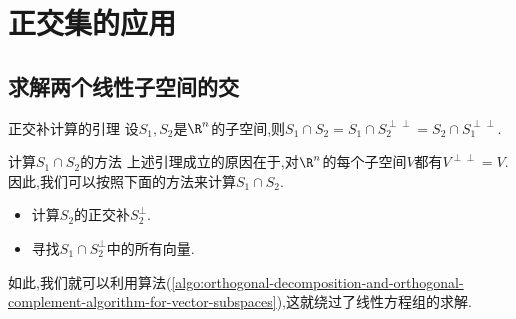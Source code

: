 \chapter{正交集的应用}

\section{求解两个线性子空间的交}

\begin{lemma}{正交补计算的引理}{}
	设$S_{1},S_{2}$是$\R^{n}$的子空间,则$S_{1}\cap S_{2}=S_{1}\cap S_{2}^{\perp\perp}=S_{2}\cap S_{1}^{\perp\perp}$.
\end{lemma}

\begin{remark}{计算$S_{1}\cap S_{2}$的方法}{}
	上述引理成立的原因在于,对$\R^{n}$的每个子空间$V$都有$V^{\perp\perp}=V$.因此,我们可以按照下面的方法来计算$S_{1}\cap S_{2}$.
	\begin{itemize}
		\item 计算$S_{2}$的正交补$S_{2}^{\perp}$.
		\item 寻找$S_{1}\cap S_{2}^{\perp}$中的所有向量.
	\end{itemize}
	如此,我们就可以利用算法(\ref{algo:orthogonal-decomposition-and-orthogonal-complement-algorithm-for-vector-subspaces}),这就绕过了线性方程组的求解.
\end{remark}